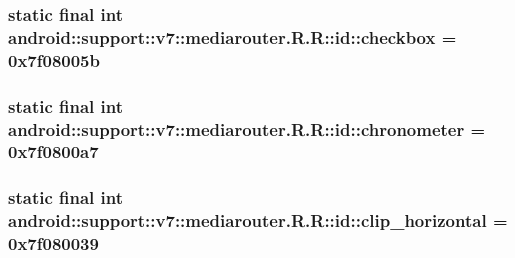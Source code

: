 \hypertarget{classandroid_1_1support_1_1v7_1_1mediarouter_1_1_r_1_1id_4b4419dfd7bb02fd6f638a4f7963a2d0}{
\subsubsection[{checkbox}]{\setlength{\rightskip}{0pt plus 5cm}static final int android::support::v7::mediarouter.R.R::id::checkbox = 0x7f08005b}}
\label{classandroid_1_1support_1_1v7_1_1mediarouter_1_1_r_1_1id_4b4419dfd7bb02fd6f638a4f7963a2d0}


\hypertarget{classandroid_1_1support_1_1v7_1_1mediarouter_1_1_r_1_1id_b7d5f7119c5d4ebf9f2b470f2b6af594}{
\subsubsection[{chronometer}]{\setlength{\rightskip}{0pt plus 5cm}static final int android::support::v7::mediarouter.R.R::id::chronometer = 0x7f0800a7}}
\label{classandroid_1_1support_1_1v7_1_1mediarouter_1_1_r_1_1id_b7d5f7119c5d4ebf9f2b470f2b6af594}


\hypertarget{classandroid_1_1support_1_1v7_1_1mediarouter_1_1_r_1_1id_3b05a43bf3450900801cbe849f19bb6b}{
\subsubsection[{clip\_\-horizontal}]{\setlength{\rightskip}{0pt plus 5cm}static final int android::support::v7::mediarouter.R.R::id::clip\_\-horizontal = 0x7f080039}}
\label{classandroid_1_1support_1_1v7_1_1mediarouter_1_1_r_1_1id_3b05a43bf3450900801cbe849f19bb6b}



